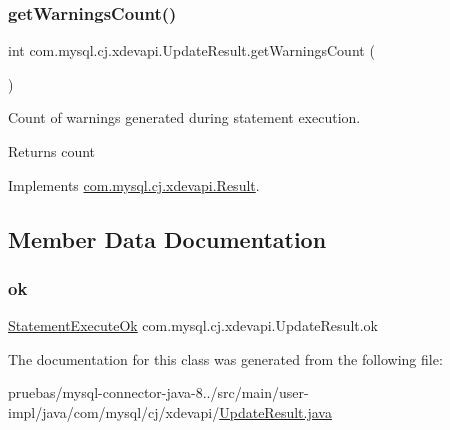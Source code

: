 \subsubsection{\texorpdfstring{get\+Warnings\+Count()}{getWarningsCount()}}
{\footnotesize\ttfamily int com.\+mysql.\+cj.\+xdevapi.\+Update\+Result.\+get\+Warnings\+Count (\begin{DoxyParamCaption}{ }\end{DoxyParamCaption})}

Count of warnings generated during statement execution.

\begin{DoxyReturn}{Returns}
count 
\end{DoxyReturn}


Implements \mbox{\hyperlink{interfacecom_1_1mysql_1_1cj_1_1xdevapi_1_1_result_addd5c82af4ab35e702d7f2961119ecc6}{com.\+mysql.\+cj.\+xdevapi.\+Result}}.



\subsection{Member Data Documentation}
\mbox{\label{classcom_1_1mysql_1_1cj_1_1xdevapi_1_1_update_result_a9314dbffc186019112194b43a86e0174}} 
\subsubsection{\texorpdfstring{ok}{ok}}
{\footnotesize\ttfamily \mbox{\hyperlink{classcom_1_1mysql_1_1cj_1_1protocol_1_1x_1_1_statement_execute_ok}{Statement\+Execute\+Ok}} com.\+mysql.\+cj.\+xdevapi.\+Update\+Result.\+ok\hspace{0.3cm}{\ttfamily [protected]}}



The documentation for this class was generated from the following file\+:\begin{DoxyCompactItemize}
\item 
pruebas/mysql-\/connector-\/java-\/8../src/main/user-\/impl/java/com/mysql/cj/xdevapi/\mbox{\hyperlink{_update_result_8java}{Update\+Result.\+java}}\end{DoxyCompactItemize}

